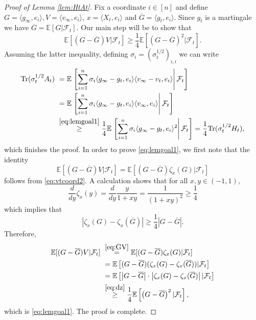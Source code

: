 \documentclass[12pt]{article}
\def \EE {\mathbb E}
\def \FF {\mathcal{F}}
\def \tr {\mathrm{Tr}}
\theoremstyle{definition}
\theoremstyle{remark}
\begin{document}
\begin{proof}[Proof of Lemma \ref{lem:HtAt}]
Fix a coordinate $i \in [n]$ and define $G=\langle g_\infty, e_i \rangle, V = \langle v_\infty, e_i \rangle$, $x = \langle X_t, e_i \rangle$ and $\overline G =\langle g_t, e_i \rangle$. Since $g_t$ is a martingale we have $\overline G = \EE [G | \FF_t]$. Our main step will be to show that
\begin{equation}\label{eq:lemgoal1}
 \EE[ (G-\overline G) V | \FF_t ] \geq \frac{1}{4} \EE[ (G-\overline G)^2 | \FF_t ].
\end{equation}
Assuming the latter inequality, defining $\sigma_i = (\sigma_t^{1/2})_{i,i}$ we can write
\begin{align*}
\tr(\sigma_t^{1/2} A_t)  ~& = \EE \left . \left [ \sum_{i=1}^n \sigma_i \langle g_\infty - g_t, e_i \rangle \langle v_\infty - v_t, e_i \rangle \right  | \FF_t \right ] \\
~& = \EE \left . \left [ \sum_{i=1}^n \sigma_i \langle g_\infty - g_t, e_i \rangle \langle v_\infty, e_i \rangle \right  | \FF_t \right ] \\
& \stackrel{\eqref{eq:lemgoal1}}{\geq} \frac{1}{4} \EE\left . \left [ \sum_{i=1}^n \sigma_i \langle g_\infty - g_t, e_i \rangle^2 \right  | \FF_t \right ]  = \frac{1}{4} \tr(\sigma_t^{1/2} H_t), 
\end{align*}
which finishes the proof. In order to prove \eqref{eq:lemgoal1}, we first note that the identity
\begin{equation}\label{eq:GV}
\EE[ (G-\overline G)V | \FF_t ] = \EE[ (G-\overline G) \zeta_{x}(G) | \FF_t]
\end{equation}
follows from \eqref{eq:vtcoord2}. A calculation shows that for all $x,y \in (-1,1)$,
$$
\frac{d}{dy} \zeta_{x}(y) = \frac{d}{dy} \frac{y}{1+xy} = \frac{1}{(1+xy)^2} \geq \frac{1}{4}
$$
which implies that
\begin{equation}\label{eq:dz}
\left | \zeta_{x}(G) - \zeta_x(\overline G) \right | \geq \frac{1}{4} |G - \overline G|.
\end{equation}
Therefore,
\begin{align*}
\EE[ (G-\overline G)V | \FF_t ] ~& \stackrel{\eqref{eq:GV}}{=} \EE[ (G-\overline G) \zeta_{x}(G) | \FF_t] \\
&= \EE \left [ (G-\overline G) (\zeta_{x}(G) - \zeta_x(\overline G)) | \FF_t \right ] \\
&= \EE \left [ \left |G-\overline G\right | \cdot \left |\zeta_{x}(G) - \zeta_x(\overline G) \right | | \FF_t \right ] \\
&\stackrel{ \eqref{eq:dz} }{\geq} \frac{1}{4} \EE \left [ \left (G-\overline G\right )^2  | \FF_t \right ],
\end{align*}
which is \eqref{eq:lemgoal1}. The proof is complete.
\end{proof}
\end{document}
